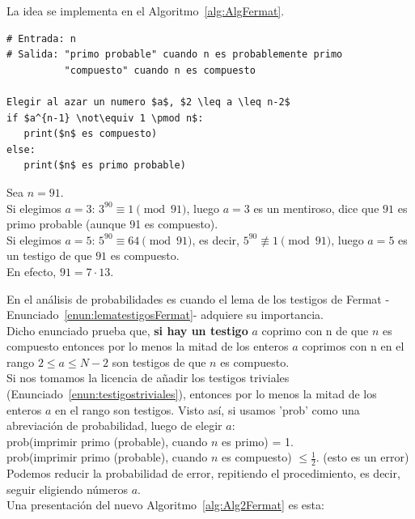 La idea se implementa en el Algoritmo~\ref{alg:AlgFermat}.

\begin{lstlisting}[caption={Test de Fermat}, label={alg:AlgFermat}, mathescape=true]
# Entrada: n
# Salida: "primo probable" cuando n es probablemente primo
          "compuesto" cuando n es compuesto

Elegir al azar un numero $a$, $2 \leq a \leq n-2$
if $a^{n-1} \not\equiv 1 \pmod n$:
   print($n$ es compuesto)
else:
   print($n$ es primo probable)
\end{lstlisting}

\begin{ejemplo} 
 Sea $n=91$. \\
 Si elegimos $a=3$: $3^{90} \equiv 1 \pmod {91}$, luego $a=3$ es un mentiroso, dice que $91$ es primo probable (aunque 91 es compuesto). \\
 Si elegimos $a=5$: $5^{90} \equiv 64 \pmod {91}$, es decir, $5^{90} \not\equiv 1 \pmod {91}$, luego $a=5$ es un testigo de que $91$ es compuesto. \\
 En efecto, $91=7 \cdot 13$.
\end{ejemplo}

En el análisis de probabilidades es cuando el lema de los testigos de Fermat -Enunciado~\ref{enun:lematestigosFermat}- adquiere su importancia. \\
Dicho enunciado prueba que, \textbf{si hay un testigo} $a$ coprimo con n de que $n$ es compuesto entonces por lo menos la mitad de los enteros $a$ coprimos con n en el rango $2 \leq a \leq N-2$ son testigos de que $n$ es compuesto. \\
Si nos tomamos la licencia de añadir los testigos triviales (Enunciado~\ref{enun:testigostriviales}), entonces por lo menos la mitad de los enteros $a$ en el rango son testigos. 
Visto así, si usamos 'prob' como una abreviación de probabilidad, luego de elegir $a$: \\

prob(imprimir primo (probable), cuando $n$ es primo) = 1.  \\
prob(imprimir primo (probable), cuando $n$ es compuesto) $\leq \frac{1}{2}$. \quad (esto es un error)\\

Podemos reducir la probabilidad de error, repitiendo el procedimiento, es decir, seguir eligiendo números $a$.\\

Una presentación del nuevo Algoritmo~\ref{alg:Alg2Fermat} es esta:

